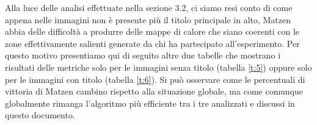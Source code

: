\documentclass[%
	corpo=12pt,
    twoside,
    stile=classica,
    oldstyle,
    tipotesi=custom,
    greek,
    evenboxes,
]{toptesi}
\begin{document}
{%
%

Alla luce delle analisi effettuate nella sezione 3.2, ci siamo resi conto di come appena nelle immagini non è presente più il titolo principale in alto, Matzen abbia delle difficoltà a produrre delle mappe di calore che siano coerenti con le zone effettivamente salienti generate da chi ha partecipato all'esperimento. Per questo motivo presentiamo qui di seguito altre due tabelle che mostrano i risultati delle metriche solo per le immagini senza titolo (tabella \ref{t:5}) oppure solo per le immagini con titolo (tabella \ref{t:6}). Si può osservare come le percentuali di vittoria di Matzen cambino rispetto alla situazione globale, ma come comunque globalmente rimanga l'algoritmo più efficiente tra i tre analizzati e discussi in questo documento.  

}
\end{document}
